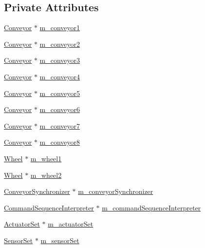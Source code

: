 \subsection*{Private Attributes}
\begin{DoxyCompactItemize}
\item 
\hyperlink{classConveyor}{Conveyor} $\ast$ \hyperlink{classPlankSortingPlant_ad5ba935847d141b8dc9842e369b8fa75}{m\-\_\-conveyor1}
\item 
\hyperlink{classConveyor}{Conveyor} $\ast$ \hyperlink{classPlankSortingPlant_a97274155c82f74a78cf12b85bb21ef1a}{m\-\_\-conveyor2}
\item 
\hyperlink{classConveyor}{Conveyor} $\ast$ \hyperlink{classPlankSortingPlant_a371d083cde882e616fa2662ba8c54697}{m\-\_\-conveyor3}
\item 
\hyperlink{classConveyor}{Conveyor} $\ast$ \hyperlink{classPlankSortingPlant_a3bc33fc093ed704b987e2ae109aa5272}{m\-\_\-conveyor4}
\item 
\hyperlink{classConveyor}{Conveyor} $\ast$ \hyperlink{classPlankSortingPlant_ac4b0efb2fee3b1b0b15637577de11533}{m\-\_\-conveyor5}
\item 
\hyperlink{classConveyor}{Conveyor} $\ast$ \hyperlink{classPlankSortingPlant_a2996b20c8f489aa477f9f795b15f1763}{m\-\_\-conveyor6}
\item 
\hyperlink{classConveyor}{Conveyor} $\ast$ \hyperlink{classPlankSortingPlant_a34e6abc7cc90688e30ed11496c535d7f}{m\-\_\-conveyor7}
\item 
\hyperlink{classConveyor}{Conveyor} $\ast$ \hyperlink{classPlankSortingPlant_aa0f88ed0f453772b867ad77adfeb2c16}{m\-\_\-conveyor8}
\item 
\hyperlink{classWheel}{Wheel} $\ast$ \hyperlink{classPlankSortingPlant_a755d0e2c79ee575d469f2db9011cf4f1}{m\-\_\-wheel1}
\item 
\hyperlink{classWheel}{Wheel} $\ast$ \hyperlink{classPlankSortingPlant_a60a0596b799edbeef6d8a61a1e6bd9fc}{m\-\_\-wheel2}
\item 
\hyperlink{classConveyorSynchronizer}{Conveyor\-Synchronizer} $\ast$ \hyperlink{classPlankSortingPlant_a944ee04de6f8ba2afa71474061fac329}{m\-\_\-conveyor\-Synchronizer}
\item 
\hyperlink{classCommandSequenceInterpreter}{Command\-Sequence\-Interpreter} $\ast$ \hyperlink{classPlankSortingPlant_ab4428fbbce9a7023848de19be0525156}{m\-\_\-command\-Sequence\-Interpreter}
\item 
\hyperlink{classActuatorSet}{Actuator\-Set} $\ast$ \hyperlink{classPlankSortingPlant_ab6c83de131a92e26c4b007a64d84dcfe}{m\-\_\-actuator\-Set}
\item 
\hyperlink{classSensorSet}{Sensor\-Set} $\ast$ \hyperlink{classPlankSortingPlant_a4946e0e57ac1049bb7602708f884579b}{m\-\_\-sensor\-Set}
\end{DoxyCompactItemize}
